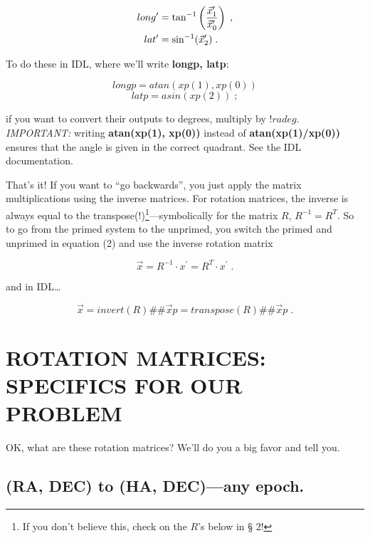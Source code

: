 \documentclass[]{article}
\begin{document}
\begin{align} 
long^\prime &= \tan^{-1} \left({{\vec x^\prime}_1 \over {\vec x^\prime}_0}\right) \; , \\ 
lat^\prime &=
\sin^{-1} ({\vec x^\prime}_2) \; .  
\end{align}

\noindent To do these in IDL, where we'll write {\bf longp, latp}:

\begin{equation}
{ longp = atan(xp(1), xp(0))}
\end{equation}
\begin{equation}
{ latp = asin(xp(2))} \; ;
\end{equation}

\noindent if you want to convert their outputs to degrees, multiply by
$!radeg$.  {\it IMPORTANT:} writing {\bf atan(xp(1), xp(0))} instead of
{\bf atan(xp(1)/xp(0))} ensures that the angle is given in the correct
quadrant.  See the IDL documentation. 

    That's it! If you want to ``go backwards'', you just apply the
matrix multiplications using the inverse matrices.  For rotation
matrices, the inverse is always equal to the transpose(!)\footnote{If
you don't believe this, check on the ${R}$'s below in \S
2!}---symbolically for the matrix ${R}$, ${R^{-1}} = {R^T}$. 
So to go from the primed system to the unprimed, you switch the primed
and unprimed in equation (2) and use the inverse rotation matrix

\begin{equation}
{\vec x} = {R^{-1} \cdot x^\prime} = {R^T \cdot x^\prime}\; .
\end{equation}

\noindent and in IDL\dots

\begin{equation} 
{\vec x} = { invert(R) } \#\# {\vec xp} = { transpose(R) } 
\#\# {\vec xp} \; .  
\end{equation}

\section {ROTATION MATRICES: SPECIFICS FOR OUR PROBLEM}

    OK, what are these rotation matrices? We'll do you a big favor
and tell you.  

\subsection {(RA, DEC) to (HA, DEC)---any epoch.}
\end{document}
